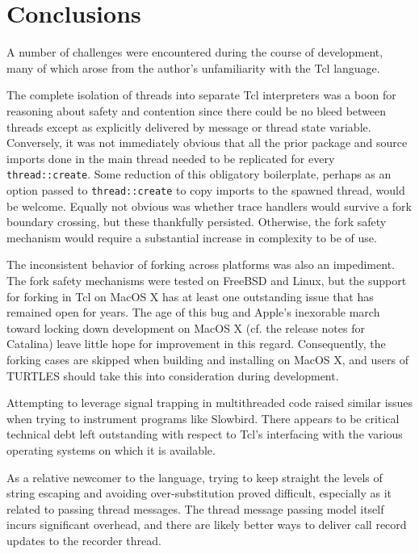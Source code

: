 \documentclass{article}[letter,10pt]
\begin{document}
\section{Conclusions}{
  A number of challenges were encountered during the course of development, many of which arose from the author's unfamiliarity
  with the Tcl language.

  The complete isolation of threads into separate Tcl interpreters was a boon for reasoning about safety and contention since
  there could be no bleed between threads except as explicitly delivered by message or thread state variable. Conversely,
  it was not immediately obvious that all the prior package and source imports done in the main thread needed to be replicated
  for every \texttt{thread::create}. Some reduction of this obligatory boilerplate, perhaps as an option passed to
  \texttt{thread::create} to copy imports to the spawned thread, would be welcome. Equally not obvious was whether trace
  handlers would survive a fork boundary crossing, but these thankfully persisted. Otherwise, the fork safety mechanism would
  require a substantial increase in complexity to be of use.

  The inconsistent behavior of forking across platforms was also an impediment. The fork safety mechanisms were tested on FreeBSD
  and Linux, but the support for forking in Tcl on MacOS X has at least one outstanding issue that has remained open for years\autocite{c4e230f29b}.
  The age of this bug and Apple's inexorable march toward locking down development on MacOS X (cf. the release notes for Catalina\autocite{scriptsonmac})
  leave little hope for improvement in this regard. Consequently, the forking cases are skipped when building
  and installing on MacOS X, and users of TURTLES should take this into consideration during development.
  
  Attempting to leverage signal trapping
  in multithreaded code raised similar issues\autocite{bounty32} when trying to instrument programs like Slowbird.
  There appears to be critical technical debt left outstanding with respect to Tcl's interfacing with the various operating systems
  on which it is available.

  As a relative newcomer to the language, trying to keep straight the levels of string escaping and avoiding over-substitution
  proved difficult, especially as it related to passing thread messages. The thread message passing model itself incurs significant
  overhead, and there are likely better ways to deliver call record updates to the recorder thread.

}
\end{document}
